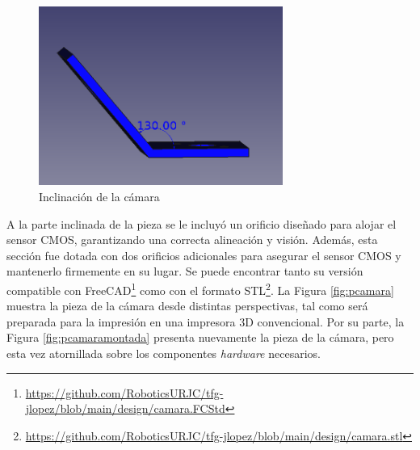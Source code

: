 \begin{figure} [h!]
	\begin{center}
		\includegraphics[width=8cm]{figs/cap5/rot.png}
	\end{center}
	\caption{Inclinación de la cámara} 
\label{fig:rot}
\end{figure}

A la parte inclinada de la pieza se le incluyó un orificio diseñado para alojar el sensor CMOS, garantizando una correcta alineación y visión. Además, esta sección fue dotada con dos orificios adicionales para asegurar el sensor CMOS y mantenerlo firmemente en su lugar. Se puede encontrar tanto su versión compatible con FreeCAD\footnote{\url{https://github.com/RoboticsURJC/tfg-jlopez/blob/main/design/camara.FCStd}} como con el formato STL\footnote{\url{https://github.com/RoboticsURJC/tfg-jlopez/blob/main/design/camara.stl}}. La Figura \ref{fig:pcamara} muestra la pieza de la cámara desde distintas perspectivas, tal como será preparada para la impresión en una impresora 3D convencional. Por su parte, la Figura \ref{fig:pcamaramontada} presenta nuevamente la pieza de la cámara, pero esta vez atornillada sobre los componentes \textit{hardware} necesarios. 

